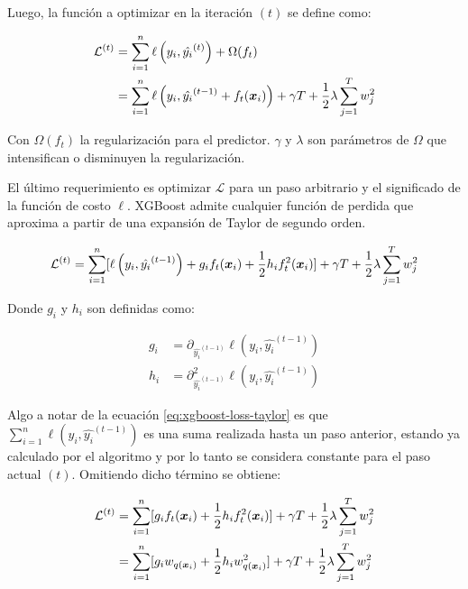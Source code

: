 Luego, la función a optimizar en la iteración $(t)$ se define como:

\begin{align}
    \mathcal{L}^{(t)} &= \sum_{i=1}^{n} \ell\left( y_i, \hat{y_i}^{(t)} \right) + \Omega(f_t) \\
                      &= \sum_{i=1}^{n} \ell\left( y_i, \hat{y_i}^{(t - 1)} + f_t{(\boldsymbol{x}_i)} \right) + \gamma T + \frac{1}{2} \lambda \sum_{j=1}^{T} w_{j}^{2}
\end{align}

Con $\Omega(f_t)$ la regularización para el predictor. $\gamma$ y $\lambda$ son
parámetros de $\Omega$ que intensifican o disminuyen la regularización.

El último requerimiento es optimizar $\mathcal{L}$ para un paso arbitrario y el
significado de la función de costo $\ell$. XGBoost admite cualquier función de
perdida que aproxima a partir de una expansión de Taylor de segundo orden.

\begin{equation} \label{eq:xgboost-loss-taylor}
    \mathcal{L}^{(t)} = \sum_{i = 1}^{n} [
        \ell\left(y_i,
                  \hat{y_{i}}^{(t-1)}
            \right) +
                g_i f_t(\boldsymbol{x}_i) +
                \frac{1}{2} h_i f_t^{2}(\boldsymbol{x}_i)
        ] + \gamma T + \frac{1}{2} \lambda \sum_{j=1}^{T} w_{j}^{2}
\end{equation}

Donde $g_i$ y $h_i$ son definidas como:

\begin{align}
    g_i &= \partial_{\hat{y_{i}}^{(t-1)}} \ell\left(y_i, \hat{y_{i}}^{(t-1)}\right) \\
    h_i &= \partial_{\hat{y_{i}}^{(t-1)}}^{2} \ell\left(y_i, \hat{y_{i}}^{(t-1)}\right)
\end{align}

Algo a notar de la ecuación \ref{eq:xgboost-loss-taylor} es que $\sum_{i =
1}^{n} \ell\left(y_i, \hat{y_{i}}^{(t-1)} \right)$ es una suma realizada hasta
un paso anterior, estando ya calculado por el algoritmo y por lo tanto se
considera constante para el paso actual $(t)$. Omitiendo dicho término se
obtiene:

\begin{align}
    \mathcal{L}^{(t)} &= \sum_{i = 1}^{n} [
        g_i f_t(\boldsymbol{x}_i) +
                \frac{1}{2} h_i f_t^{2}(\boldsymbol{x}_i)
        ] + \gamma T + \frac{1}{2} \lambda \sum_{j=1}^{T} w_{j}^{2} \\
                      &= \sum_{i = 1}^{n} [ \label{eq:xgboost-loss-final}
                        g_i w_{q(\boldsymbol{x}_i)} +
                                \frac{1}{2} h_i w_{q(\boldsymbol{x}_i)}^{2}
                        ] + \gamma T + \frac{1}{2} \lambda \sum_{j=1}^{T} w_{j}^{2}
\end{align}

